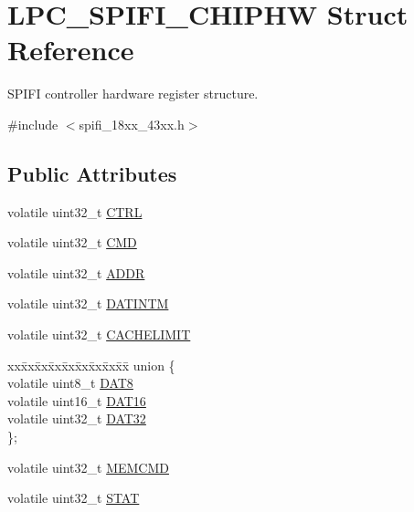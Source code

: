 \hypertarget{struct_l_p_c___s_p_i_f_i___c_h_i_p_h_w}{}\section{L\+P\+C\+\_\+\+S\+P\+I\+F\+I\+\_\+\+C\+H\+I\+P\+HW Struct Reference}
\label{struct_l_p_c___s_p_i_f_i___c_h_i_p_h_w}


S\+P\+I\+FI controller hardware register structure.  




{\ttfamily \#include $<$spifi\+\_\+18xx\+\_\+43xx.\+h$>$}

\subsection*{Public Attributes}
\begin{DoxyCompactItemize}
\item 
volatile uint32\+\_\+t \hyperlink{struct_l_p_c___s_p_i_f_i___c_h_i_p_h_w_aa5cfd9510dc9cf2afb91747941835d7c}{C\+T\+RL}
\item 
volatile uint32\+\_\+t \hyperlink{struct_l_p_c___s_p_i_f_i___c_h_i_p_h_w_a645e1f281883825586bd21419748c21b}{C\+MD}
\item 
volatile uint32\+\_\+t \hyperlink{struct_l_p_c___s_p_i_f_i___c_h_i_p_h_w_a059e53b1f56365a1ba9b2047ee0302d7}{A\+D\+DR}
\item 
volatile uint32\+\_\+t \hyperlink{struct_l_p_c___s_p_i_f_i___c_h_i_p_h_w_a02303cbcbe16ad64dddc5fd62cc7ad18}{D\+A\+T\+I\+N\+TM}
\item 
volatile uint32\+\_\+t \hyperlink{struct_l_p_c___s_p_i_f_i___c_h_i_p_h_w_a480c3a746ef6a54590ef380d6827c32c}{C\+A\+C\+H\+E\+L\+I\+M\+IT}
\item 
\begin{tabbing}
xx\=xx\=xx\=xx\=xx\=xx\=xx\=xx\=xx\=\kill
union \{\\
\>volatile uint8\_t \hyperlink{struct_l_p_c___s_p_i_f_i___c_h_i_p_h_w_a0849f2a0701bf9496e5eb239feef8570}{DAT8}\\
\>volatile uint16\_t \hyperlink{struct_l_p_c___s_p_i_f_i___c_h_i_p_h_w_a7ac1f982688987ec6b0f92eacaf1b15f}{DAT16}\\
\>volatile uint32\_t \hyperlink{struct_l_p_c___s_p_i_f_i___c_h_i_p_h_w_abcdb05d6307ee3a2f23d21ffbb288841}{DAT32}\\
\}; \\

\end{tabbing}\item 
volatile uint32\+\_\+t \hyperlink{struct_l_p_c___s_p_i_f_i___c_h_i_p_h_w_a25ed30206ef50e1a253fa379ca579b66}{M\+E\+M\+C\+MD}
\item 
volatile uint32\+\_\+t \hyperlink{struct_l_p_c___s_p_i_f_i___c_h_i_p_h_w_a6616b2a89aa36854e8479613dc797fda}{S\+T\+AT}
\end{DoxyCompactItemize}


